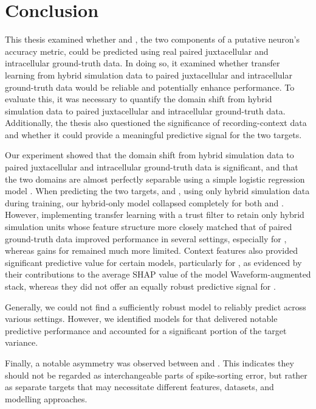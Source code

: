 \chapter{Conclusion}
\label{chap:conclusion}

This thesis examined whether \fpos{} and \fmiss{}, the two components of a putative neuron's accuracy metric, could be predicted using real paired juxtacellular and intracellular ground-truth data. In doing so, it examined whether transfer learning from hybrid simulation data to paired juxtacellular and intracellular ground-truth data would be reliable and potentially enhance performance. To evaluate this, it was necessary to quantify the domain shift from hybrid simulation data to paired juxtacellular and intracellular ground-truth data. Additionally, the thesis also questioned the significance of recording-context data and whether it could provide a meaningful predictive signal for the two targets.

Our experiment showed that the domain shift from hybrid simulation data to paired juxtacellular and intracellular ground-truth data is significant, and that the two domains are almost perfectly separable using a simple logistic regression model \parencite{10.1111/j.2517-6161.1958.tb00292.x}. When predicting the two targets, \fpos{} and \fmiss{}, using only hybrid simulation data during training, our hybrid-only model collapsed completely for both \fpos{} and \fmiss{}. However, implementing transfer learning with a trust filter to retain only hybrid simulation units whose feature structure more closely matched that of paired ground-truth data improved performance in several settings, especially for \fpos{}, whereas gains for \fmiss{} remained much more limited. Context features also provided significant predictive value for certain models, particularly for \fpos{}, as evidenced by their contributions to the average SHAP value \parencite{lundberg2017unifiedapproachinterpretingmodel} of the \fpos{} model Waveform-augmented stack, whereas they did not offer an equally robust predictive signal for \fmiss{}.

Generally, we could not find a sufficiently robust model to reliably predict \fmiss{} across various settings. However, we identified models for \fpos{} that delivered notable predictive performance and accounted for a significant portion of the target variance.

Finally, a notable asymmetry was observed between \fpos{} and \fmiss{}. This indicates they should not be regarded as interchangeable parts of spike-sorting error, but rather as separate targets that may necessitate different features, datasets, and modelling approaches.

